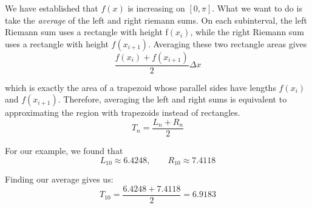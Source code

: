We have established that $f(x)$ is increasing on $[0, \pi]$. What we want to do is take the \emph{average} of the left and right riemann sums. On each subinterval, the left Riemann sum uses a rectangle with height f$(x_i)$, while the right Riemann sum uses a rectangle with height $f(x_{i+1})$. Averaging these two rectangle areas gives
$$\frac{f(x_i)+f(x_{i+1})}{2}\Delta x$$

which is exactly the area of a trapezoid whose parallel sides have lengths $f(x_i)$ and $f(x_{i+1})$. Therefore, averaging the left and right sums is equivalent to approximating the region with trapezoids instead of rectangles.
\[
	T_n=\frac{L_n+R_n}{2}
\]

For our example, we found that
$$L_{10}\approx 6.4248, \qquad R_{10}\approx 7.4118$$

Finding our average gives us:
$$T_{10}=\frac{6.4248+7.4118}{2}=6.9183$$

